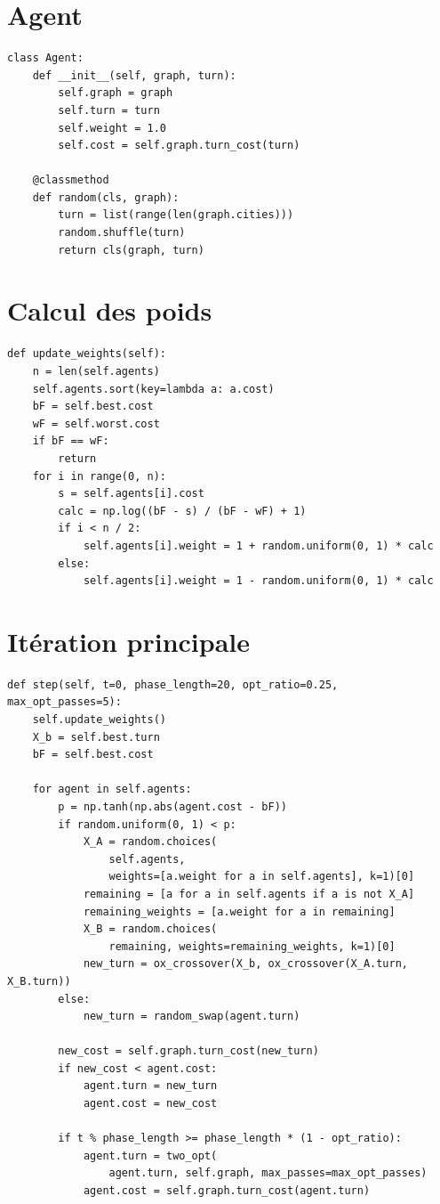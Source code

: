 \documentclass[12pt,a4paper]{report}
\begin{document}
\section{Agent}
\begin{lstlisting}
class Agent:
    def __init__(self, graph, turn):
        self.graph = graph
        self.turn = turn
        self.weight = 1.0
        self.cost = self.graph.turn_cost(turn)

    @classmethod
    def random(cls, graph):
        turn = list(range(len(graph.cities)))
        random.shuffle(turn)
        return cls(graph, turn)
\end{lstlisting}

\section{Calcul des poids}
\begin{lstlisting}
def update_weights(self):
    n = len(self.agents)
    self.agents.sort(key=lambda a: a.cost)
    bF = self.best.cost
    wF = self.worst.cost
    if bF == wF:
        return
    for i in range(0, n):
        s = self.agents[i].cost
        calc = np.log((bF - s) / (bF - wF) + 1)
        if i < n / 2:
            self.agents[i].weight = 1 + random.uniform(0, 1) * calc
        else:
            self.agents[i].weight = 1 - random.uniform(0, 1) * calc
\end{lstlisting}

\section{Itération principale}
\begin{lstlisting}
def step(self, t=0, phase_length=20, opt_ratio=0.25, max_opt_passes=5):
    self.update_weights()
    X_b = self.best.turn
    bF = self.best.cost

    for agent in self.agents:
        p = np.tanh(np.abs(agent.cost - bF))
        if random.uniform(0, 1) < p:
            X_A = random.choices(
                self.agents,
                weights=[a.weight for a in self.agents], k=1)[0]
            remaining = [a for a in self.agents if a is not X_A]
            remaining_weights = [a.weight for a in remaining]
            X_B = random.choices(
                remaining, weights=remaining_weights, k=1)[0]
            new_turn = ox_crossover(X_b, ox_crossover(X_A.turn, X_B.turn))
        else:
            new_turn = random_swap(agent.turn)

        new_cost = self.graph.turn_cost(new_turn)
        if new_cost < agent.cost:
            agent.turn = new_turn
            agent.cost = new_cost

        if t % phase_length >= phase_length * (1 - opt_ratio):
            agent.turn = two_opt(
                agent.turn, self.graph, max_passes=max_opt_passes)
            agent.cost = self.graph.turn_cost(agent.turn)
\end{lstlisting}
\end{document}
